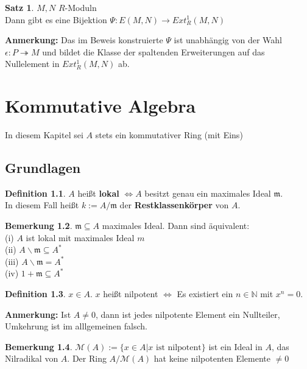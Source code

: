 \documentclass[10pt,a4paper,numbers=endperiod]{scrreprt}
\theoremstyle{definition}
\newtheorem{satz}{Satz}[section]
\newtheorem{defi}[satz]{Definition}
\newtheorem{bem}[satz]{Bemerkung}
\def\NN{{\mathbb N}}
\begin{document}
\begin{satz}
	$M, N$ $R$-Moduln\\
	Dann gibt es eine Bijektion $\Psi: E(M, N) \longrightarrow Ext_R^1(M, N)$
\end{satz}

\textbf{Anmerkung:} Das im Beweis konstruierte $\Psi$ ist unabhängig von der Wahl $\epsilon: P \twoheadrightarrow M$ und bildet die Klasse der spaltenden Erweiterungen auf das Nullelement in $Ext_R^1 (M, N)$ ab.

\part{Kommutative Algebra} 

In diesem Kapitel sei $A$ stets ein kommutativer Ring (mit Eins)

\chapter{Grundlagen} 

\begin{defi}
	$A$ heißt \textbf{lokal} $\Leftrightarrow A$ besitzt genau ein maximales Ideal $\mathfrak{m}$.\\
	In diesem Fall heißt $k := A/ \mathfrak{m}$ der \textbf{Restklassenkörper} von $A$. 
\end{defi}

\begin{bem}
	$\mathfrak{m}\subseteq A$ maximales Ideal. Dann sind äquivalent:\\
	(i) $A$ ist lokal mit maximales Ideal $m$\\
	(ii) $A \backslash \mathfrak{m} \subseteq  A^*$\\
	(iii) $A \backslash \mathfrak{m} = A^*$\\
	(iv) $1 + \mathfrak{m} \subseteq A^*$
\end{bem}

\begin{defi}
	$x \in A$. $x$ heißt nilpotent $\Leftrightarrow$ Es existiert ein $n \in \NN$ mit $x^n = 0$.
\end{defi}

\textbf{Anmerkung:} Ist $A \neq 0$, dann ist jedes nilpotente Element ein Nullteiler, Umkehrung ist im alllgemeinen falsch.

\begin{bem}
	$\mathcal{M}(A) := \{x \in A| x \text{ ist nilpotent}\}$ ist ein Ideal in $A$, das Nilradikal von $A$. Der Ring $A/\mathcal{M}(A)$ hat keine nilpotenten Elemente $\neq 0$
\end{bem}
\end{document}
